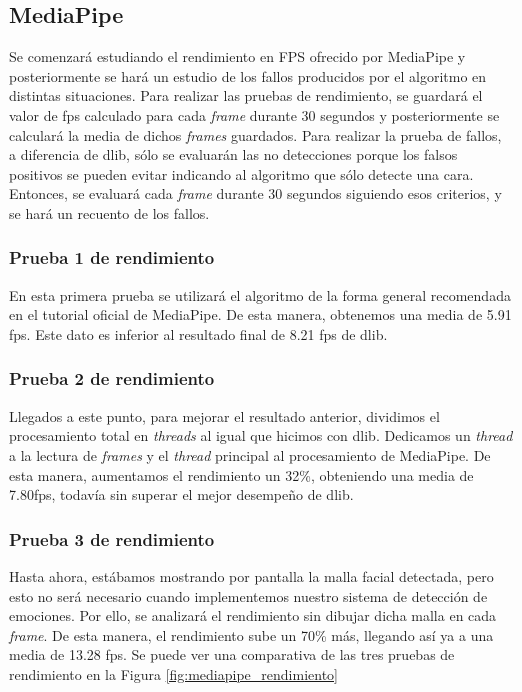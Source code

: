 \subsection{MediaPipe}
Se comenzará estudiando el rendimiento en FPS ofrecido por MediaPipe y posteriormente se hará un estudio de los fallos producidos por el algoritmo en distintas situaciones. Para realizar las pruebas de rendimiento, se guardará el valor de fps calculado para cada \textit{frame} durante 30 segundos y posteriormente se calculará la media de dichos \textit{frames} guardados. Para realizar la prueba de fallos, a diferencia de dlib, sólo se evaluarán las no detecciones porque los falsos positivos se pueden evitar indicando al algoritmo que sólo detecte una cara. Entonces, se evaluará cada \textit{frame} durante 30 segundos siguiendo esos criterios, y se hará un recuento de los fallos.

\subsubsection{Prueba 1 de rendimiento}
En esta primera prueba se utilizará el algoritmo de la forma general recomendada en el tutorial oficial de MediaPipe. De esta manera, obtenemos una media de 5.91 fps. Este dato es inferior al resultado final de 8.21 fps de dlib.

\subsubsection{Prueba 2 de rendimiento}
Llegados a este punto, para mejorar el resultado anterior, dividimos el procesamiento total en \textit{threads} al igual que hicimos con dlib. Dedicamos un \textit{thread} a la lectura de \textit{frames} y el \textit{thread} principal al procesamiento de MediaPipe. De esta manera, aumentamos el rendimiento un 32\%, obteniendo una media de 7.80fps, todavía sin superar el mejor desempeño de dlib.

\subsubsection{Prueba 3 de rendimiento}
Hasta ahora, estábamos mostrando por pantalla la malla facial detectada, pero esto no será necesario cuando implementemos nuestro sistema de detección de emociones. Por ello, se analizará el rendimiento sin dibujar dicha malla en cada \textit{frame}. De esta manera, el rendimiento sube un 70\% más, llegando así ya a una media de 13.28 fps. Se puede ver una comparativa de las tres pruebas de rendimiento en la Figura \ref{fig:mediapipe_rendimiento}


